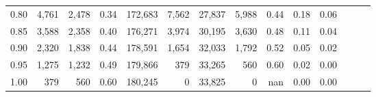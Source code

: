 \begin{tabular}{rrrrrrrrrrrrrr}
0.80 &   4,761 &  2,478 &  0.34 &  172,683 &    7,562 &  27,837 &   5,988 &  0.44 &  0.18 &      0.06 \\
0.85 &   3,588 &  2,358 &  0.40 &  176,271 &    3,974 &  30,195 &   3,630 &  0.48 &  0.11 &      0.04 \\
0.90 &   2,320 &  1,838 &  0.44 &  178,591 &    1,654 &  32,033 &   1,792 &  0.52 &  0.05 &      0.02 \\
0.95 &   1,275 &  1,232 &  0.49 &  179,866 &      379 &  33,265 &     560 &  0.60 &  0.02 &      0.00 \\
1.00 &     379 &    560 &  0.60 &  180,245 &        0 &  33,825 &       0 &   nan &  0.00 &      0.00 \\
\bottomrule
\end{tabular}
